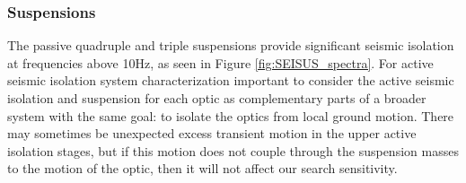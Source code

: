 \subsubsection{Suspensions}

The passive quadruple and triple suspensions provide significant seismic isolation at frequencies above 10Hz, as seen in Figure \ref{fig:SEISUS_spectra}. For active seismic isolation system characterization important to consider the active seismic isolation and suspension for each optic as complementary parts of a broader system with the same goal: to isolate the optics from local ground motion. There may sometimes be unexpected excess transient motion in the upper active isolation stages, but if this motion does not couple through the suspension masses to the motion of the optic, then it will not affect our search sensitivity. 






